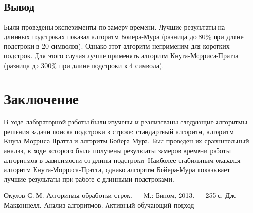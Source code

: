 \documentclass[a4paper,12pt]{report}
\begin{document}
    \section{Вывод}

        Были проведены эксперименты по замеру времени. 
        Лучшие результаты на длинных подстроках показал алгоритм Бойера-Мура (разница до 80\% при длине подстроки в 20 символов). 
        Однако этот алгоритм неприменим для коротких подстрок. Для этого случая лучше применять алгоритм Кнута-Морриса-Пратта (разница до 300\% при длине подстроки в 4 символа).

    \newpage

    \chapter*{Заключение}
        \label{sec:conclusion_part}
        
        В ходе лабораторной работы были изучены и реализованы следующие алгоритмы решения задачи поиска подстроки в строке: стандартный алгоритм, алгоритм Кнута-Морриса-Пратта и алгоритм Бойера-Мура. 
        Был проведен их сравнительный анализ, в ходе которого были получены результаты замеров времени работы алгоритмов в зависимости от длины подстроки. 
        Наиболее стабильным оказался алгоритм Кнута-Морриса-Пратта, однако алгоритм Бойера-Мура показывает лучшие результаты при работе с длинными подстроками.
        
    \begin{thebibliography}{3}
    	 Окулов С. М. Алгоритмы обработки строк. — М.: Бином, 2013. — 255 с.
    	 Дж. Макконнелл. Анализ алгоритмов. Активный обучающий подход
    \end{thebibliography}
        
\end{document}
